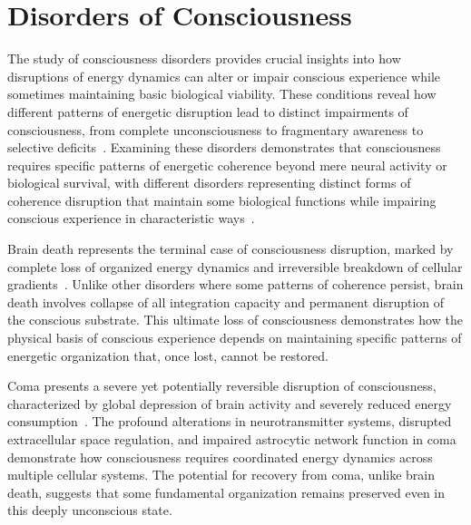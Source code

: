 \section{Disorders of Consciousness}

The study of consciousness disorders provides crucial insights into how disruptions of energy dynamics can alter or impair conscious experience while sometimes maintaining basic biological viability. These conditions reveal how different patterns of energetic disruption lead to distinct impairments of consciousness, from complete unconsciousness to fragmentary awareness to selective deficits~\cite{Girdhar2025}. Examining these disorders demonstrates that consciousness requires specific patterns of energetic coherence beyond mere neural activity or biological survival, with different disorders representing distinct forms of coherence disruption that maintain some biological functions while impairing conscious experience in characteristic ways~\cite{zheng2025unbearable}.


Brain death represents the terminal case of consciousness disruption, marked by complete loss of organized energy dynamics and irreversible breakdown of cellular gradients~\cite{bosl2025dynamical}. Unlike other disorders where some patterns of coherence persist, brain death involves collapse of all integration capacity and permanent disruption of the conscious substrate. This ultimate loss of consciousness demonstrates how the physical basis of conscious experience depends on maintaining specific patterns of energetic organization that, once lost, cannot be restored.

Coma presents a severe yet potentially reversible disruption of consciousness, characterized by global depression of brain activity and severely reduced energy consumption~\cite{van2025processes}. The profound alterations in neurotransmitter systems, disrupted extracellular space regulation, and impaired astrocytic network function in coma demonstrate how consciousness requires coordinated energy dynamics across multiple cellular systems. The potential for recovery from coma, unlike brain death, suggests that some fundamental organization remains preserved even in this deeply unconscious state.

